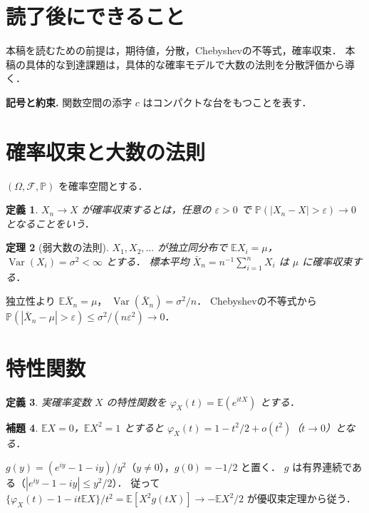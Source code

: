 \documentclass[a5paper,10pt,onecolumn]{jsarticle}
\makeatletter
\theoremstyle{mathnotetheorem}
\newtheorem{theorem}{定理}[section]
\newtheorem{definition}[theorem]{定義}
\newtheorem{lemma}[theorem]{補題}
\renewcommand{\proofname}{証明}
\renewenvironment{proof}[1][\proofname]{%
  \par\pushQED{\qed}\normalfont\topsep4\p@\@plus2\p@\relax
  \trivlist\item[\hskip\labelsep\bfseries #1]\ignorespaces
}{\popQED\endtrivlist\@endpefalse}
\makeatother
\begin{document}
\section*{読了後にできること}
本稿を読むための前提は，期待値，分散，Chebyshevの不等式，確率収束．
本稿の具体的な到達課題は，具体的な確率モデルで大数の法則を分散評価から導く．


\par\noindent\textbf{記号と約束.}\quad
関数空間の添字 $c$ はコンパクトな台をもつことを表す．
\par

\section{確率収束と大数の法則}
$(\Omega,\mathcal F,\mathbb P)$ を確率空間とする．
\begin{definition}
$X_n\to X$ が確率収束するとは，任意の $\varepsilon>0$ で
$\mathbb P(|X_n-X|>\varepsilon)\to0$ となることをいう．
\end{definition}
\begin{theorem}[弱大数の法則]
$X_1,X_2,\ldots$ が独立同分布で
$\mathbb E X_i=\mu$，$\operatorname{Var}(X_i)=\sigma^2<\infty$ とする．
標本平均 $\bar X_n=n^{-1}\sum_{i=1}^nX_i$ は $\mu$ に確率収束する．
\end{theorem}
\begin{proof}
独立性より $\mathbb E\bar X_n=\mu$，
$\operatorname{Var}(\bar X_n)=\sigma^2/n$．
Chebyshevの不等式から
$\mathbb P(|\bar X_n-\mu|>\varepsilon)\le\sigma^2/(n\varepsilon^2)\to0$．
\end{proof}
\section{特性関数}
\begin{definition}
実確率変数 $X$ の特性関数を $\varphi_X(t)=\mathbb E(e^{itX})$ とする．
\end{definition}
\begin{lemma}
$\mathbb E X=0$，$\mathbb E X^2=1$ とすると
$\varphi_X(t)=1-t^2/2+o(t^2)$（$t\to0$）となる．
\end{lemma}
\begin{proof}
$g(y)=(e^{iy}-1-iy)/y^2$（$y\ne0$），$g(0)=-1/2$ と置く．
$g$ は有界連続である（$|e^{iy}-1-iy|\le y^2/2$）．
従って
$\{\varphi_X(t)-1-it\mathbb E X\}/t^2
=\mathbb E[X^2g(tX)]\to-\mathbb E X^2/2$ が優収束定理から従う．
\end{proof}
\end{document}
